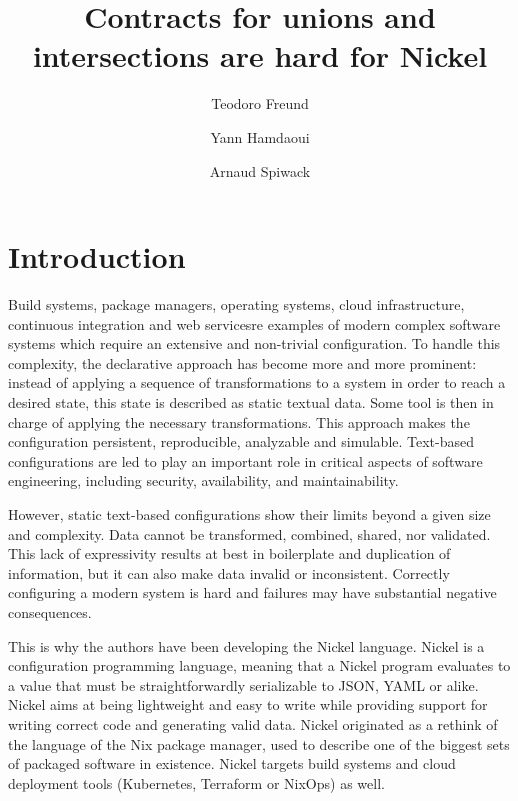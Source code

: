 \documentclass[sigplan,10pt,review,anonymous]{acmart}
\title{Contracts for unions and intersections are hard for Nickel}
\author{Teodoro Freund}
\affiliation{
  \institution{???}
  \city{Buenos Aires}
  \country{Argentina}
}
\author{Yann Hamdaoui}
\affiliation{
  \institution{Tweag}
  \city{Paris}
  \country{France}
}
\author{Arnaud Spiwack}
\affiliation{
  \institution{Tweag}
  \city{Paris}
  \country{France}
}
\newcommand{\unsure}[2][1=]{}
\newcommand{\info}[2][1=]{}
\newcommand{\resolved}[2]{}
\begin{document}
\maketitle

\unsure{TODO: CCS classification; Keywords}
\section{Introduction}
\info{Goals of the paper: position paper: unions/intersections nice in
theory problematic in practice. In particular non-orthogonal with the
rest of the features of your language.}

Build systems, package managers, operating systems, cloud infrastructure,
continuous integration and web services\resolved{Also continuous integration}
are examples of modern complex software systems which require an extensive and
non-trivial configuration. To handle this complexity, the declarative approach
has become more and more prominent: instead of applying a sequence of
transformations to a system in order to reach a desired state, this state is
described as static textual data. Some tool is then in charge of applying the
necessary transformations. This approach makes the configuration persistent,
reproducible, analyzable and simulable. Text-based configurations are led to
play an important role in critical aspects of software engineering, including
security, availability, and maintainability.

However, static text-based configurations show their limits beyond a given size
and complexity. Data cannot be transformed, combined, shared, nor validated.
This lack of expressivity results at best in boilerplate and duplication of
information, but it can also make data invalid or inconsistent. Correctly
configuring a modern system is hard and failures may have substantial negative
consequences.

This is why the authors have been developing the Nickel
language\cite{NickelRepo}. Nickel is a configuration programming language,
meaning that a Nickel program evaluates to a value that must be
straightforwardly serializable to JSON, YAML or alike. Nickel aims at being
lightweight and easy to write while providing support for writing correct code
and generating valid data. Nickel originated as a rethink of the language of the
Nix package manager, used to describe one of the biggest sets of packaged
software in existence\cite{repology}.  Nickel targets build systems and cloud deployment
tools (Kubernetes, Terraform or NixOps) as well.
\end{document}
